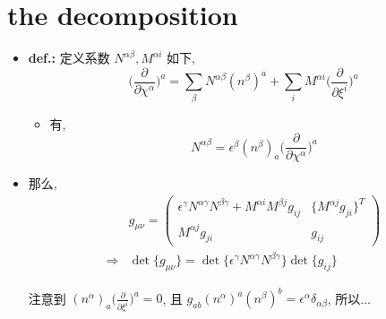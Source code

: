 \section{the decomposition}
\begin{itemize}
	\item \textbf{def.:} 定义系数 $N^{\alpha \beta}, M^{\alpha i}$ 如下,
	\begin{equation}
		\Big( \frac{\partial}{\partial \chi^\alpha} \Big)^a = \sum_\beta N^{\alpha \beta} (n^\beta)^a + \sum_i M^{\alpha i} \Big( \frac{\partial}{\partial \xi^i} \Big)^a
	\end{equation}
	\begin{itemize}
		\item 有,
		\begin{equation} \label{C.2.2}
			N^{\alpha \beta} = \epsilon^\beta (n^\beta)_a \Big( \frac{\partial}{\partial \chi^\alpha} \Big)^a
		\end{equation}
	\end{itemize}
	
	\item 那么,
	\begin{align}
		& g_{\mu \nu} = \begin{pmatrix}
			\epsilon^\gamma N^{\alpha \gamma} N^{\beta \gamma} + M^{\alpha i} M^{\beta j} g_{i j} & \{M^{\alpha j} g_{j i}\}^T \\
			M^{\alpha j} g_{j i} & g_{i j}
		\end{pmatrix} \\
		\Longrightarrow & \det \{g_{\mu \nu}\} = \det \{\epsilon^\gamma N^{\alpha \gamma} N^{\beta \gamma}\} \det \{g_{i j}\}
	\end{align}
	
	\begin{tcolorbox}[title=calculation:]
		注意到 $(n^\alpha)_a \big( \frac{\partial}{\partial \xi^i} \big)^a = 0$, 且 $g_{a b} (n^\alpha)^a (n^\beta)^b = \epsilon^\alpha \delta_{\alpha \beta}$, 所以...
	\end{tcolorbox}
\end{itemize}

